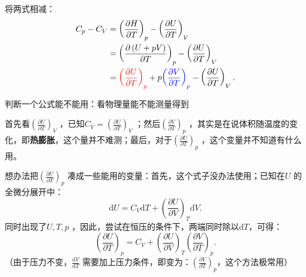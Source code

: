 将两式相减：
\begin{align*}
    C_{p}-C_{V} &= \left(\frac{\partial H}{\partial T}\right)_{p}-\left(\frac{\partial U}{\partial T}\right)_{V}\\
    &= \left(\frac{\partial \left( U+pV \right)}{\partial T}\right)_{p}-\left(\frac{\partial U}{\partial T}\right)_{V} \\
    &= \textcolor{red}{\left(\frac{\partial U}{\partial T}\right)_{p}}+p\textcolor{blue}{\left(\frac{\partial V}{\partial T}\right)_{p}}-\left(\frac{\partial U}{\partial T}\right)_{V}
.\end{align*}
\begin{notation}
    判断一个公式能不能用：看物理量能不能测量得到
\end{notation}
首先看$\left(\frac{\partial U}{\partial T}\right)_{V}$ ，已知$C_{V} = \left(\frac{\partial U}{\partial T}\right)_{V}$ ；然后$\left(\frac{\partial V}{\partial T}\right)_{p}$ ，其实是在说体积随温度的变化，即\textbf{热膨胀}，这个量并不难测；最后，对于$\left(\frac{\partial U}{\partial T}\right)_{p}$ ，这个变量并不知道有什么用。

想办法把$\left(\frac{\partial U}{\partial T}\right)_{p}$ 凑成一些能用的变量：首先，这个式子没办法使用；已知在$U$ 的全微分展开中：\[
    \mathrm{d}U = C_{V}\mathrm{d}T + \left(\frac{\partial U}{\partial V}\right)_{T}\mathrm{d}V
.\]
同时出现了$U,T,p$ ，因此，尝试在恒压的条件下，两端同时除以$\mathrm{d}T$，可得：\[
    \left(\frac{\partial U}{\partial T}\right)_{p} = C_{V} + \left(\frac{\partial U}{\partial V}\right)_{T}\left(\frac{\partial V}{\partial T}\right)_{p}
.\]
（由于压力不变，$\frac{\mathrm{d}V}{\mathrm{d}T}$ 需要加上压力条件，即变为：$\left(\frac{\partial V}{\partial T}\right)_{p}$，这个方法极常用）


